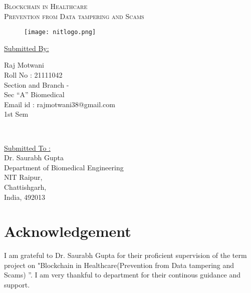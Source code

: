 \documentclass[12pt]{article}
\begin{document}
\newcommand{\HRule}{\rule{\linewidth}{70mm}}
\center

\textsc{\Huge Blockchain in Healthcare\\ Prevention from Data tampering and Scams}\\[1cm]
\begin{figure}[h]
\centering
\texttt{[image: nitlogo.png]}
\end{figure}


	\begin{minipage}{0.5\textwidth}
		\begin{flushleft}
		\Large
			\underline{ Submitted By:}
			\newline
			
          		Raj Motwani \\
			   Roll No : 21111042 \\
			   Section and Branch -\\Sec ``A'' Biomedical \\
			   Email id : rajmotwani38@gmail.com \\
			   1st Sem
			   
			\end{flushleft}
	\end{minipage}
	~
	\begin{minipage}{0.4\textwidth}
		\begin{flushright}
			\Large
			\underline{ Submitted To :}\\
			
		
			Dr. Saurabh Gupta \\ Department of Biomedical Engineering\\
            NIT Raipur,\\ Chattishgarh,\\
             India, 492013\\
			
			
			
			
		\end{flushright}
	\end{minipage}
	
\newpage
\centering
\section*{\Huge Acknowledgement}
\raggedright
\LARGE I am grateful to Dr. Saurabh Gupta for their proficient supervision of the term project on "Blockchain in Healthcare(Prevention from Data tampering and Scams) ”. I am very thankful to department for their continous guidance and support.\\
	
\end{document}
